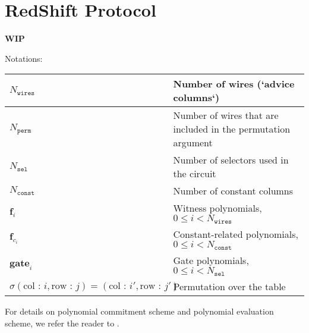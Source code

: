 \section{RedShift Protocol}
\label{section:protocol}
\textbf{WIP}

Notations:

\begin{center}
    \begin{table}[H]
        \begin{tabular}{| l | l |}
            \hline
            $N_{\texttt{wires}}$                                                              & Number of wires (`advice columns`)                            \\
            \hline
            $N_{\texttt{perm}}$                                                               & Number of wires that are included in the permutation argument \\
            \hline
            $N_{\texttt{sel}}$                                                                & Number of selectors used in the circuit                       \\
            \hline
            $N_{\texttt{const}}$                                                              & Number of constant columns                                    \\
            \hline
            $\textbf{f}_i$                                                                    & Witness polynomials, $0 \leq i < N_{\texttt{wires}}$          \\
            \hline
            $\textbf{f}_{c_i}$                                                                & Constant-related polynomials, $0 \leq i < N_{\texttt{const}}$ \\
            \hline
            $\textbf{gate}_i$                                                                 & Gate polynomials, $0 \leq i < N_{\texttt{sel}}$               \\
            \hline
            $\sigma(\text{col : } i, \text{row : } j) = (\text{col : } i', \text{row : } j')$ & Permutation over the table \\
            \hline
        \end{tabular}
    \end{table}
\end{center}

For details on polynomial commitment scheme and polynomial evaluation scheme, we refer the reader to \cite{cryptoeprint:2019:1400}.


